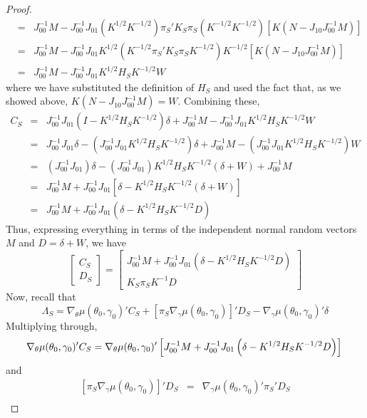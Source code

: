 \documentclass[12pt]{article}
\theoremstyle{definition}
\begin{document}
\begin{proof}
\begin{eqnarray*}
			&=& J_{00}^{-1}M  - J_{00}^{-1}J_{01}\left(K^{1/2}K^{-1/2}\right)\pi_S'K_S\pi_S\left(K^{-1/2}K^{-1/2}\right)\left[K\left(N - J_{10}J_{00}^{-1}M\right)\right]  \\
			&=& J_{00}^{-1}M  - J_{00}^{-1}J_{01}K^{1/2}\left(K^{-1/2}\pi_S'K_S\pi_SK^{-1/2}\right)K^{-1/2}\left[K\left(N - J_{10}J_{00}^{-1}M\right)\right]  \\
			&=& J_{00}^{-1}M  - J_{00}^{-1}J_{01}K^{1/2}H_SK^{-1/2}W 
	\end{eqnarray*}
where we have substituted the definition of $H_S$ and  used the fact that, as we showed above, $K(N - J_{10}J_{00}^{-1}M) = W$. Combining these, 
	\begin{eqnarray*}
	C_S &=& J_{00}^{-1}J_{01}\left( I -  K^{1/2}H_SK^{-1/2}\right) \delta + J_{00}^{-1}M  - J_{00}^{-1}J_{01}K^{1/2}H_SK^{-1/2}W \\
		&=& J_{00}^{-1}J_{01}\delta -  \left(J_{00}^{-1}J_{01}K^{1/2}H_SK^{-1/2}\right)\delta + J_{00}^{-1}M  - \left(J_{00}^{-1}J_{01}K^{1/2}H_SK^{-1/2}\right)W \\
		&=& \left(J_{00}^{-1}J_{01}\right)\delta -  \left(J_{00}^{-1}J_{01}\right)K^{1/2}H_SK^{-1/2}(\delta+W) + J_{00}^{-1}M \\
		&=& J_{00}^{-1}M + J_{00}^{-1}J_{01}\left[\delta -  K^{1/2}H_SK^{-1/2}(\delta+W)\right]\\
		&=& J_{00}^{-1}M + J_{00}^{-1}J_{01}\left(\delta -  K^{1/2}H_SK^{-1/2}D\right)
\end{eqnarray*}
Thus, expressing everything in terms of the independent normal random vectors $M$ and $D = \delta + W$, we have
	$$
	\left[\begin{array}{c}
		C_S\\
		D_S
	\end{array}\right] = 	\left[\begin{array}{c}
		 J_{00}^{-1}M + J_{00}^{-1}J_{01}\left(\delta -  K^{1/2}H_SK^{-1/2}D\right)\\
		K_S \pi_S K^{-1}D
	\end{array}\right] 
$$
Now, recall that
	$$
	\Lambda_S  = \nabla_{\theta}\mu(\theta_0, \gamma_0)'C_S + \left[\pi_S\nabla_\gamma \mu(\theta_0, \gamma_0)\right]'D_S - \nabla_\gamma \mu(\theta_0,\gamma_0)'\delta
$$
Multiplying through,
	$$
			\nabla_{\theta}\mu(\theta_0, \gamma_0)'C_S = 		 \nabla_{\theta}\mu(\theta_0, \gamma_0)'\left[J_{00}^{-1}M + J_{00}^{-1}J_{01}\left(\delta -  K^{1/2}H_SK^{-1/2}D\right)\right]\\
$$
and
	\begin{eqnarray*}
			\left[\pi_S\nabla_\gamma \mu(\theta_0, \gamma_0)\right]'D_S &=& \nabla_\gamma \mu(\theta_0, \gamma_0)'\pi_S' D_S\\

\end{eqnarray*}
\end{proof}
\end{document}
